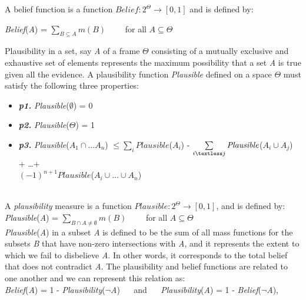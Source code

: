 \documentclass[11pt]{article}
\begin{document}
A belief function is a function $Belief:2^\Theta\rightarrow[0,1]$ and is defined
by:

\textit{Belief}(\textit{A}) = $\sum\limits_{B \subseteq A}m(B)\qquad$ for all $A
\subseteq \Theta$

Plausibility in a set, say \textit{A} of a frame $\Theta$ consisting of a
mutually exclusive and exhaustive set of elements represents the maximum
possibility that a set \textit{A} is true given all the evidence. A plausibility
function \textit{Plausible} defined on a space $\Theta$ must satisfy the
following three properties:

\begin{itemize}
	\item[]\textit{\textbf{p1.}} \textit{Plausible}($\emptyset$) = 0
	\item[]\textit{\textbf{p2.}} \textit{Plausible}($\Theta$) = 1
	\item[]\textit{\textbf{p3.}} \small\textit{Plausible}($A_1 \cap \ldots A_n$)
	$\leq \sum\limits_i\textit{Plausible}$($A_i$) - $\sum\limits_{i \textless
	j}\textit{Plausible}$($A_i \cup A_j$) + \ldots +\\
	$(-1)^{n+1}\textit{Plausible}$($A_i \cup \ldots \cup A_n$)\\ \\
\end{itemize}

A \textit{plausibility} measure is a function
$Plausible:2^\Theta\rightarrow[0,1]$, and is defined by:\\

\textit{Plausible}(\textit{A}) = $\sum\limits_{B \cap A \neq
\emptyset}m(B)\qquad$ for all $A \subseteq \Theta$\\

\noindent \textit{Plausible}(\textit{A}) in a subset \textit{A} is defined to
be the sum of all mass functions for the subsets \textit{B} that have non-zero
intersections with \textit{A}, and it represents the extent to which we fail to
disbelieve \textit{A}. In other words, it corresponds to the total belief that
does not contradict \textit{A}. The plausibility and belief functions are
related to one another and we can represent this relation as:\\

\noindent\textit{Belief}(\textit{A}) = 1 -
\textit{Plausibility}(\textit{$\neg$A}) $\quad$ and $\quad$
\textit{Plausibility}(\textit{A}) = 1 - \textit{Belief}(\textit{$\neg$A}),\\
\end{document}
